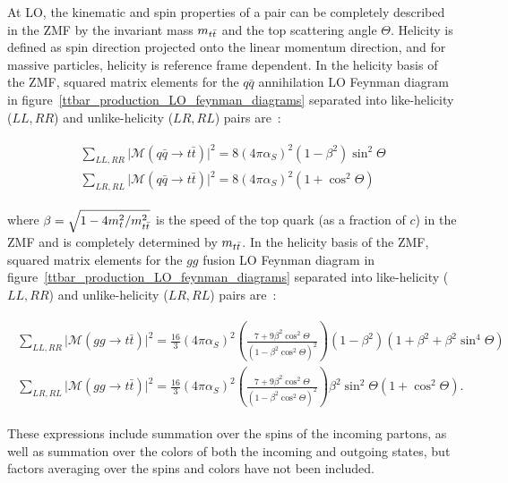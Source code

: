 At LO, the kinematic and spin properties of a \ttbar pair can be completely described in the \ttbar ZMF by the invariant mass $m_{t\bar{t}}$ and the top scattering angle $\Theta$.
Helicity is defined as spin direction projected onto the linear momentum direction, and for massive particles, helicity is reference frame dependent.
In the helicity basis of the \ttbar ZMF, squared matrix elements for the $q\bar{q}$ annihilation LO Feynman diagram in figure~\ref{ttbar_production_LO_feynman_diagrams} separated into like-helicity ($L L, R R$) and unlike-helicity ($L R, R L$) \ttbar pairs are~\cite{PhysRevD.53.4886}:
\begin{linenomath*}
\begin{align}
\begin{array}{c}
\sum_{L L, R R}\vert\mathcal{M}(q \bar{q} \rightarrow t \bar{t})\vert^2=8 (4 \pi \alpha_S)^2 \left(1-\beta^2\right) \sin ^2 \Theta \\
\sum_{L R, R L}\vert\mathcal{M}(q \bar{q} \rightarrow t \bar{t})\vert^2=8 (4 \pi \alpha_S)^2 \left(1+\cos ^2 \Theta\right)
\end{array}
\label{qq_matrix_elements}
\end{align}
\end{linenomath*}
where $\beta=\sqrt{1-4 m_t^2 / m_{t\bar{t}}^2}$ is the speed of the top quark (as a fraction of $c$) in the \ttbar ZMF and is completely determined by $m_{t\bar{t}}$.
In the helicity basis of the \ttbar ZMF, squared matrix elements for the $gg$ fusion LO Feynman diagram in figure~\ref{ttbar_production_LO_feynman_diagrams} separated into like-helicity ($L L, R R$) and unlike-helicity ($L R, R L$) \ttbar pairs are~\cite{PhysRevD.53.4886}:
\begin{linenomath*}
\begin{align}
\begin{array}{c}
\sum_{L L, R R}\vert\mathcal{M}(g g \rightarrow t \bar{t})\vert^2=\frac{16}{3} (4 \pi \alpha_S)^2 (\frac{7+9 \beta^2 \cos ^2 \Theta}{\left(1-\beta^2 \cos ^2 \Theta\right)^2}) \left(1-\beta^2\right)\left(1+\beta^2+\beta^2 \sin ^4 \Theta\right) \\
\sum_{L R, R L}\vert\mathcal{M}(g g \rightarrow t \bar{t})\vert^2=\frac{16}{3} (4 \pi \alpha_S)^2 (\frac{7+9 \beta^2 \cos ^2 \Theta}{\left(1-\beta^2 \cos ^2 \Theta\right)^2}) \beta^2 \sin ^2 \Theta\left(1+\cos ^2 \Theta\right).
\end{array}
\label{gg_matrix_elements}
\end{align}
\end{linenomath*}
These expressions include summation over the spins of the incoming partons, as well as summation over the colors of both the incoming and outgoing states, but factors averaging over the spins and colors have not been included.

